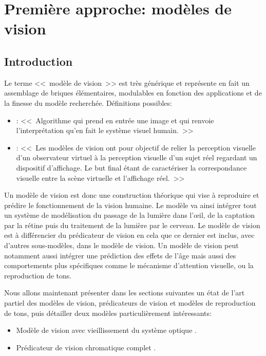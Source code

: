 \part{Première approche: modèles de vision}
	\chapter*{Introduction}
	\par Le terme <<~modèle de vision~>> est très générique et représente en fait un assemblage de briques élémentaires, modulables en fonction des applications et de la finesse du modèle recherchée. Définitions possibles:
	\begin{itemize}
		\item \citep{moreau_traite_2006}: <<~Algorithme qui prend en entrée une image et qui renvoie l'interprétation qu'en fait le système visuel humain.~>>
		\item \citep{pattanaik_multiscale_1998}: <<~Les modèles de vision ont pour objectif de relier la perception visuelle d'un observateur virtuel à la perception visuelle d'un sujet réel regardant un dispositif d'affichage. Le but final étant de caractériser la correspondance visuelle entre la scène virtuelle et l'affichage réel.~>>
	\end{itemize}
	
	\par Un modèle de vision est donc une construction théorique qui vise à reproduire et prédire le fonctionnement de la vision humaine. Le modèle va ainsi intégrer tout un système de modélisation du passage de la lumière dans l'œil, de la captation par la rétine puis du traitement de la lumière par le cerveau. Le modèle de vision est à différencier du prédicateur de vision en cela que ce dernier est inclus, avec d'autres sous-modèles, dans le modèle de vision. Un modèle de vision peut notamment aussi intégrer une prédiction des effets de l'âge mais aussi des comportements plus spécifiques comme le mécanisme d'attention visuelle, ou la reproduction de tons.
	
	\par Nous allons maintenant présenter dans les sections suivantes un état de l'art partiel des modèles de vision, prédicateurs de vision et modèles de reproduction de tons, puis détailler deux modèles particulièrement intéressants:
	\begin{itemize}
		\item Modèle de vision avec vieillissement du système optique \citep{mantiuk_human_2015}.
		\item Prédicateur de vision chromatique complet \citep{pattanaik_multiscale_1998}.
	\end{itemize}
	
